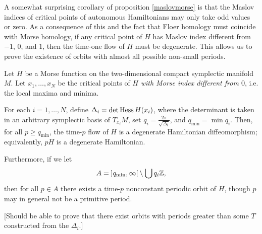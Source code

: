 A somewhat surprising corollary of proposition \ref{maslovmorse} is that the Maslov indices of critical points of autonomous Hamiltonians may only take odd values or zero. As a consequence of this and the fact that Floer homology must coincide with Morse homology, if any critical point of $H$ has Maslov index different from $-1$, $0$, and $1$, then the time-one flow of $H$ must be degenerate. This allows us to prove the existence of orbits with almost all possible non-small periods.

\begin{corollary}
Let $H$ be a Morse function on the two-dimensional compact symplectic manifold $M$. Let $x_1, \dots, x_N$ be the critical points of $H$ \emph{with Morse index different from $0$}, i.e. the local maxima and minima.

For each $i = 1, \dots, N$, define $\Delta_i = \det \operatorname{Hess} H(x_i)$, where the determinant is taken in an arbitrary symplectic basis of $T_{x_i} M$, set $q_i = \frac{2\pi}{\sqrt{\Delta_i}}$, and $q_{\min} = \min q_i$. Then, for all $p \geq q_{\min}$, the time-$p$ flow of $H$ is a degenerate Hamiltonian diffeomorphism; equivalently, $p H$ is a degenerate Hamiltonian.

Furthermore, if we let
\begin{equation}
A = \ointerval{q_{\min}}{\infty} \setminus \bigcup q_i \Z,
\end{equation}
then for all $p \in A$ there exists a time-$p$ nonconstant periodic orbit of $H$, though $p$ may in general not be a primitive period.

[Should be able to prove that there exist orbits with periods greater than some $T$ constructed from the $\Delta_i$.]
\end{corollary}

